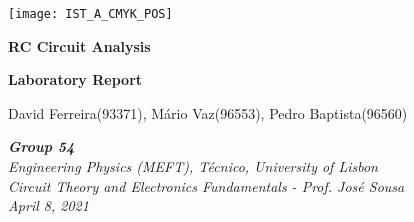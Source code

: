 
\thispagestyle {empty}

\texttt{[image: IST\_A\_CMYK\_POS]}

\begin{center}
%
\vspace{1.0cm}
\begin{center}\Large\textbf{RC Circuit Analysis}\end{center}
\begin{center}\large\textbf{Laboratory Report}\end{center}

\begin{center} David Ferreira(93371), Mário Vaz(96553), Pedro Baptista(96560)\end{center}

\begin{center} \textit {\textbf{Group 54} \\Engineering Physics (MEFT), Técnico, University of Lisbon\\ Circuit Theory and Electronics Fundamentals - \small Prof. José Sousa\\April 8, 2021}\end{center}
%
\end{center}

